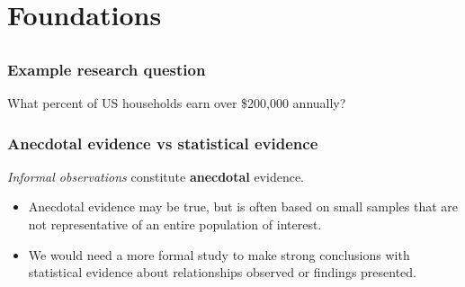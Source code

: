 \section[Foundations]{Foundations}
\subsection{}
\begin{frame}
\end{frame}



\begin{frame}
\frametitle{Example research question}
What percent of US households earn over \$200,000 annually?
\end{frame}

\begin{frame}
\frametitle{Anecdotal evidence vs statistical evidence}
\emph{Informal observations} constitute \textbf{anecdotal} evidence.\\
\vskip10pt
\begin{itemize}
    \item
    Anecdotal evidence may be true, but is often based on small samples that are not representative of an entire population of interest.
    \item
    We would need a more formal study to make strong conclusions with statistical evidence about relationships observed or findings presented.
\end{itemize}
\end{frame}


